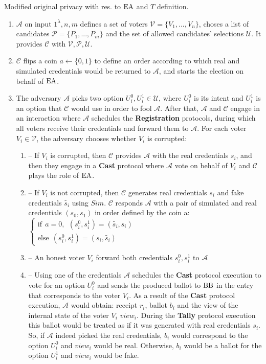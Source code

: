 \begin{definition}{ Modified original privacy with res. to $\operatorname{EA}$ and $T$ definition.}
\begin{enumerate}
\item $\mathcal{A}$ on input $1^{\lambda},n,m$ defines a set of voters  $\mathcal{V} = \{V_1,...,V_n\}$, choses a list of candidates  $\mathcal{P} = \{P_1,...,P_m\}$ and the set of allowed candidates' selections $\mathcal{U}$.  It provides $\mathcal{C}$ with $\mathcal{V}, \mathcal{P}, \mathcal{U}$.
\item $\mathcal{C}$ flips a coin $a \leftarrow \{0,1\}$ to define an order according to which real and simulated credentials would be returned to $\mathcal{A}$, and starts the election on behalf of $\operatorname{EA}$.  
\item The adversary $\mathcal{A}$ picks two option $U^0_i,U^1_i \in \mathcal{U}$, where $U^0_i$ is its intent and $U^1_i$ is an option that $\mathcal{C}$ would use in order to fool $\mathcal{A}$.  After that, $\mathcal{A}$  and $\mathcal{C}$ engage in an interaction where $\mathcal{A}$ schedules the \textbf{Registration} protocols, during which all voters receive their credentials and forward them to  $\mathcal{A}$. For each voter $V_i \in \mathcal{V}$, the adversary chooses whether $V_i$ is corrupted:
\begin{enumerate}
\item[] -- If $V_i$ is corrupted, then $\mathcal{C}$ provides $\mathcal{A}$ with the real credentials $s_i$, and then they engage in a \textbf{Cast} protocol where $\mathcal{A}$  vote on behalf of $V_i$ and  $\mathcal{C}$ plays the role of $\operatorname{EA}$.
\item[] --  If $V_i$ is not corrupted, then $\mathcal{C}$ generates real credentials $s_i$ and fake credentials $\tilde{s_i}$ using $Sim$.  $\mathcal{C}$  responds  $\mathcal{A}$ with a pair of simulated and real credentials $(s_0,s_1)$ in order defined by the coin a:\\
$ \begin{cases}
 \text{if} ~~a =0,~~ (s^0_i,s^1_i) = (\tilde{s_i},s_i)  \\ 
 \text{else}~~  (s^0_i,s^1_i) = (s_i,\tilde{s_i})
\end{cases}$
 \item[] -- An honest voter $V_i$ forward both credentials $s^0_i,s^1_i$ to $\mathcal{A}$
\item[] -- Using one of the credentials $\mathcal{A}$ schedules the \textbf{Cast} protocol execution to vote for an option $U^0_i$ and sends the produced ballot to $\operatorname{BB}$ in the entry that corresponds to the voter $V_i$. As a result of the \textbf{Cast} protocol execution, $\mathcal{A}$ would obtain: receipt $r_i$, ballot $b_i$ and the view of the internal state of the voter $V_i$ $view_i$.  During the \textbf{Tally} protocol execution this ballot would be treated as if it was generated with real credentials $s_i$. So, if  $\mathcal{A}$ indeed picked the real credentials, $b_i$ would correspond to the option   $U^0_i$  and $view_i$ would be real. Otherwise, $b_i$ would be a ballot for the option  $U^1_i$ and $view_i$ would be fake. 

\end{enumerate}
\end{enumerate}
\end{definition}
